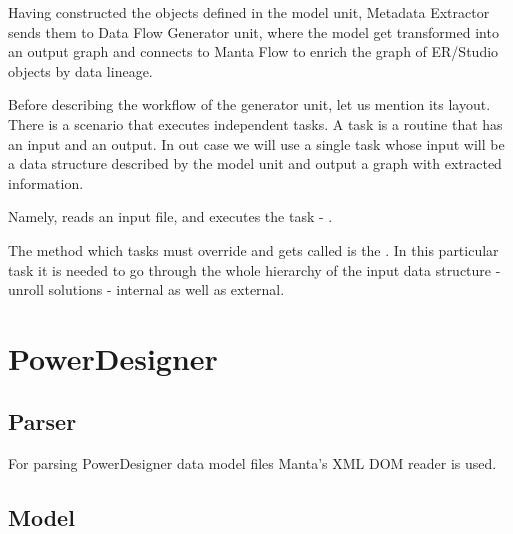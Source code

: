Having constructed the objects defined in the model unit, Metadata Extractor sends them to Data Flow Generator unit, where the model get transformed into an output graph and connects to Manta Flow to enrich the graph of ER/Studio objects by data lineage.

Before describing the workflow of the generator unit, let us mention its layout.
There is a scenario that executes independent tasks. A task is a routine that has an input and an output. In out case we will use a single task whose input will be a data structure described by the model unit and output a graph with extracted information.

 Namely,  reads an input file, and executes the task - . 
 
 The method which tasks must override and gets called is the . In this particular task it is needed to go through the whole hierarchy of the input data structure -  unroll solutions - internal as well as external. 




\section{PowerDesigner}

\subsection{Parser}

For parsing PowerDesigner data model files Manta's XML DOM reader is used.

\subsection{Model}

